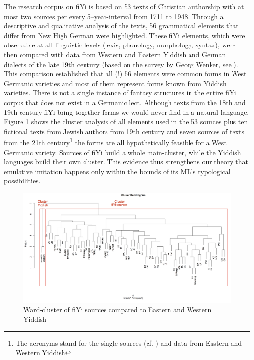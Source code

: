 \documentclass[output=paper]{LSP/langsci}
\begin{document}
The research corpus on fiYi is based on 53 texts of Christian authorship with at most two sources per every 5–year-interval from 1711 to 1948. Through a descriptive and qualitative analysis of the texts, 56 grammatical elements that differ from New High German were highlighted. These fiYi elements, which were observable at all linguistic levels (lexis, phonology, morphology, syntax), were then compared with data from Western and Eastern Yiddish and German dialects of the late 19th century (based on the survey by Georg Wenker, see \cite{wenker_schriften_2013}).\\
This comparison established that all (!) 56 elements were common forms in West Germanic varieties and most of them represent forms known from Yiddish varieties. There is not a single instance of fantasy structures in the entire fiYi corpus that does not exist in a Germanic lect. Although texts from the 18th and 19th century fiYi bring together forms we would never find in a natural language. Figure \ref{RplotWJOJALLE} shows the cluster analysis of all elements used in the 53 sources plus ten fictional texts from Jewish authors from 19th century and seven sources of texts from the 21th century\footnote{The acronyms stand for the single sources (cf. \cite{SchaeferDiss}) and data from Eastern and Western Yiddish} the forms are all hypothetically feasible for a West Germanic variety. Sources of fiYi build a whole main-cluster, while the Yiddish languages build their own cluster. This evidence thus strengthens our theory that emulative imitation happens only within the bounds of its ML’s typological possibilities.
 
 \begin{figure}[h!]
\includegraphics[width=\textwidth]{illustrations/schaf_etal_fig5}%
		\caption{\label{RplotWJOJALLE} Ward-cluster of fiYi sources compared to Eastern and Western Yiddish}
	\end{figure}
\FloatBarrier
  
\end{document}

